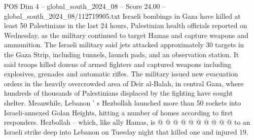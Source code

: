 \begin{textsample}{POS Dim 4 – global\_south\_2024\_08 – Score 24.00 – global\_south\_2024\_08/112719905.txt}
Israeli bombings in Gaza have killed at least 50 Palestinians in the last 24 hours, Palestinian health officials reported on Wednesday, as the military continued to target Hamas and capture weapons and ammunition.
The Israeli military said jets attacked approximately 30 targets in the Gaza Strip, including tunnels, launch pads, and an observation station.
It said troops killed dozens of armed fighters and captured weapons including explosives, grenades and automatic rifles.
The military issued new evacuation orders in the heavily overcrowded area of Deir al-Balah, in central Gaza, where hundreds of thousands of Palestinians displaced by the fighting have sought shelter.
Meanwhile, Lebanon ' s Hezbollah launched more than 50 rockets into Israeli-annexed Golan Heights, hitting a number of homes according to first responders.
Hezbollah -- which, like ally Hamas, is @ @ @ @ @ @ @ @ @ @ to an Israeli strike deep into Lebanon on Tuesday night that killed one and injured 19.

\end{textsample}
